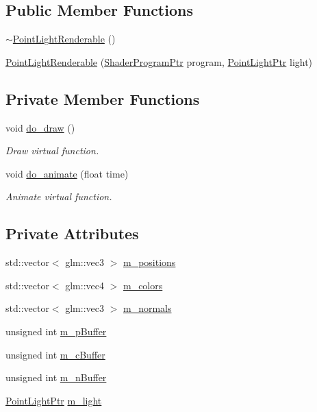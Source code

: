 \subsection*{Public Member Functions}
\begin{DoxyCompactItemize}
\item 
\hyperlink{classPointLightRenderable_a7f981bb9210b5b50f982d5929eb1c27c}{$\sim$\+Point\+Light\+Renderable} ()
\item 
\hyperlink{classPointLightRenderable_a7eadc444c01d09bff0b612c4707b3c80}{Point\+Light\+Renderable} (\hyperlink{ShaderProgram_8hpp_af8e4af1ad4c53875ee5d32ab7e1f4966}{Shader\+Program\+Ptr} program, \hyperlink{Light_8hpp_a28898b9799350669037caef13c5115d2}{Point\+Light\+Ptr} light)
\end{DoxyCompactItemize}
\subsection*{Private Member Functions}
\begin{DoxyCompactItemize}
\item 
void \hyperlink{classPointLightRenderable_afdb8498c6af494231394d96a3f3f2315}{do\+\_\+draw} ()
\begin{DoxyCompactList}\small\item\em Draw virtual function. \end{DoxyCompactList}\item 
void \hyperlink{classPointLightRenderable_a5c4efe61c5061c739d3b68a7702f9df4}{do\+\_\+animate} (float time)
\begin{DoxyCompactList}\small\item\em Animate virtual function. \end{DoxyCompactList}\end{DoxyCompactItemize}
\subsection*{Private Attributes}
\begin{DoxyCompactItemize}
\item 
std\+::vector$<$ glm\+::vec3 $>$ \hyperlink{classPointLightRenderable_ae63fb46f04473b2c25c46e61744922aa}{m\+\_\+positions}
\item 
std\+::vector$<$ glm\+::vec4 $>$ \hyperlink{classPointLightRenderable_a6d45d8ebfe800a578f22a6cfa0b7981c}{m\+\_\+colors}
\item 
std\+::vector$<$ glm\+::vec3 $>$ \hyperlink{classPointLightRenderable_a91714162c3bed982468ba2e506430585}{m\+\_\+normals}
\item 
unsigned int \hyperlink{classPointLightRenderable_a013e5165f655d3a43144a4a16bcec001}{m\+\_\+p\+Buffer}
\item 
unsigned int \hyperlink{classPointLightRenderable_ab2f20160f2e541d4822ef4120c70dfc3}{m\+\_\+c\+Buffer}
\item 
unsigned int \hyperlink{classPointLightRenderable_af8c0b76df5c6f9470ffec65afea21b83}{m\+\_\+n\+Buffer}
\item 
\hyperlink{Light_8hpp_a28898b9799350669037caef13c5115d2}{Point\+Light\+Ptr} \hyperlink{classPointLightRenderable_a937b4cab5b786b27414374505769d1ce}{m\+\_\+light}
\end{DoxyCompactItemize}
